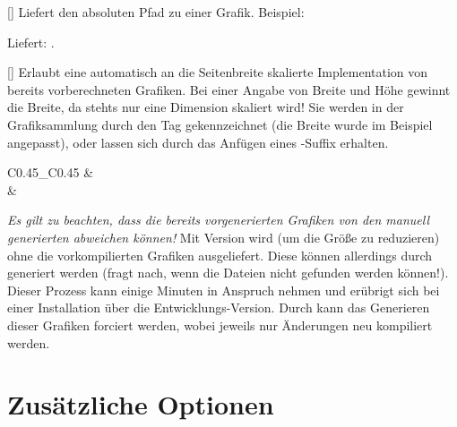 []
Liefert den absoluten Pfad zu einer Grafik. Beispiel:
\begin{latex*}
\end{latex*}
Liefert: .

%
%
%

[]
Erlaubt eine automatisch an die Seitenbreite skalierte Implementation von bereits vorberechneten Grafiken. Bei einer Angabe von Breite und Höhe gewinnt die Breite, da stehts nur eine Dimension skaliert wird! Sie werden in der Grafiksammlung durch den Tag  gekennzeichnet (die Breite wurde im Beispiel angepasst), oder lassen sich durch das Anfügen eines -Suffix erhalten.
\iflillycompact\else\begin{center}
    \begin{tabular}{C{0.45\linewidth}_C{0.45\linewidth}}
         &  \\
        {\tiny {}} & {\tiny{}}
    \end{tabular}
\end{center}\fi
\emph{Es gilt zu beachten, dass die bereits vorgenerierten Grafiken von den manuell generierten abweichen können!}
Mit Version  wird \Jake (um die Größe zu reduzieren) ohne die vorkompilierten Grafiken ausgeliefert. Diese können allerdings durch  generiert werden (\Jake fragt nach, wenn die Dateien nicht gefunden werden können!). Dieser Prozess kann einige Minuten in Anspruch nehmen und erübrigt sich bei einer Installation über die Entwicklungs-Version. Durch  kann das Generieren dieser Grafiken forciert werden, wobei jeweils nur Änderungen neu kompiliert werden.

%
%
%
%
%

\section{Zusätzliche Optionen}

